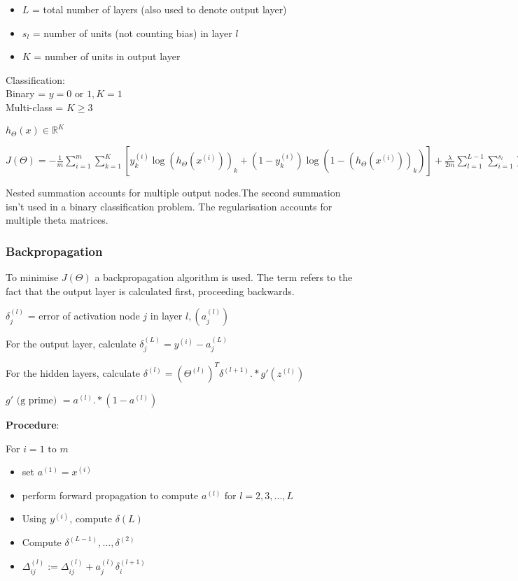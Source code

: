 \documentclass[12pt, a4paper]{article}
\begin{document}
      \begin{itemize}
        \item $L$ = total number of layers (also used to denote output layer)
        \item $s_l$ = number of units (not counting bias) in layer $l$
        \item $K$ = number of units in output layer
      \end{itemize}{
      
      Classification:\\
      Binary = $y = 0 \text{ or } 1, K = 1$\\
      Multi-class = $K \geq 3$

      $h_\Theta(x) \in \mathbb{R}^K$

      $J(\Theta) = -\frac{1}{m} \displaystyle\sum_{i=1}^m \displaystyle
      \sum_{k=1}^K \left[y_k^{(i)} \log(h_\Theta(x^{(i)}))_k + (1-y_k^{(i)})
      \log(1-(h_\Theta(x^{(i)}))_k)\right] + \frac{\lambda}{2m} \displaystyle
      \sum_{l=1}^{L-1} \displaystyle\sum_{i=1}^{s_l} \displaystyle
      \sum_{j=1}^{s_l+1} (\Theta_{ji}^{(l)})^2$

      Nested summation accounts for multiple output nodes.The second summation
      isn't used in a binary classification problem. The regularisation
      accounts for multiple theta matrices.

    \subsubsection{Backpropagation}

      To minimise $J(\Theta)$ a backpropagation algorithm is used. The term
      refers to the fact that the output layer is calculated first, proceeding
      backwards.

      $\delta_j^{(l)}$ = error of activation node $j$ in layer $l, (a_j^{(l)})$

      For the output layer, calculate $\delta_j^{(L)} = y^{(i)} - a_j^{(L)}$

      For the hidden layers, calculate $\delta^{(l)} = (\Theta^{(l)})^T 
      \delta^{(l+1)} .* g'(z^{(l)})$

      $g' \text{ (g prime) } = a^{(l)} .* (1-a^{(l)})$

      \textbf{Procedure}:

      For $i = 1 \text{ to } m$
      \vspace{-1em}
      \begin{itemize}
        \item set $a^{(1)} = x^{(i)}$
        \item perform forward propagation to compute $a^{(l)} \text{ for } 
              l = 2,3,...,L$
        \item Using $y^{(i)}$, compute $\delta{(L)}$
        \item Compute $\delta^{(L-1)},\dots,\delta^{(2)}$
        \item $\Delta_{ij}^{(l)} := \Delta_{ij}^{(l)} + a_j^{(l)}
              \delta_i^{(l+1)}$
      \end{itemize}
      
}
\end{document}
